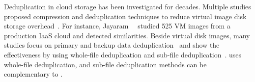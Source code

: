 %
%
%
%

Deduplication in cloud storage has been investigated for decades.
%
Multiple studies proposed compression and deduplication techniques to reduce virtual
image disk storage
overhead~\cite{zhou2013characterizing,srinivasan2012idedup,jin2009effectiveness}.
%
For instance, Jayaram~\etal~\cite{jayaram2011empirical} studied 525 VM images
from a production IaaS cloud and detected similarities. 
Beside virtual disk images, many studies focus on primary and backup data
deduplication~\cite{tarasov2014dmdedup,muthitacharoen2001low,lu2012insights,2009-sparse_indexing_inline_dedup_using_sampling-fast,2013-charact_increment_changes_data_protect-atc,wallace2012characteristics,zhu2008avoiding}
and show the effectiveness by using whole-file deduplication and sub-file
deduplication~\cite{2012-hpc_practical_dedup_study-sc,msst16dedup-study}.
%
\sysname uses whole-file deduplication, and sub-file deduplication methods can
be complementary to \sysname.


